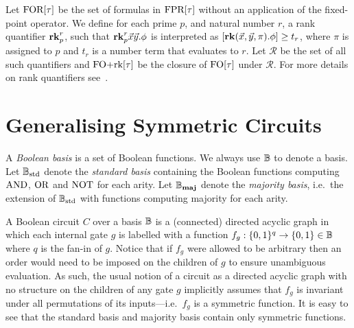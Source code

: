 \documentclass[a4paper,UKenglish]{lipics-v2018}
\begin{document}
Let $\text{\upshape FOR}[\tau]$ be the set of formulas in $\text{\upshape FPR}[\tau]$ without an application
of the fixed-point operator. We define for each prime $p$, and natural number
$r$, a rank quantifier $\text{\textbf{rk}}^r_p$, such that $\text{\textbf{rk}}^r_p\vec{x}\vec{y}. \phi$ is
interpreted as $[\text{\textbf{rk}} (\vec{x}, \vec{y}, \pi) . \phi] \geq t_r$, where $\pi$ is
assigned to $p$ and $t_r$ is a number term that evaluates to $r$. Let
$\mathcal{R}$ be the set of all such quantifiers and $\text{\upshape FO+rk}[\tau]$ be the
closure of $\text{\upshape FO}[\tau]$ under $\mathcal{R}$. For more details on rank quantifiers
see~\cite{Dawar09logicswith}.


\section{Generalising Symmetric Circuits}\label{sec:symm-circ}
A \emph{Boolean basis} is a set of Boolean functions. We always use $\mathbb{B}$ to
denote a basis. Let $\mathbb{B}_{\text{std}}$ denote the \emph{standard basis} containing the
Boolean functions computing $\text{\upshape AND}$, $\text{\upshape OR}$ and $\text{\upshape NOT}$ for each arity. Let $\mathbb{B}_{\text{\textbf{maj}}}$
denote the \emph{majority basis}, i.e.\ the extension of $\mathbb{B}_{\text{std}}$ with functions
computing majority for each arity.

A Boolean circuit $C$ over a basis $\mathbb{B}$ is a (connected) directed acyclic graph
in which each internal gate $g$ is labelled with a function $f_g : \{0,1\}^q \rightarrow
\{0,1\} \in \mathbb{B}$ where $q$ is the fan-in of $g$. Notice that if $f_g$ were
allowed to be arbitrary then an order would need to be imposed on the children
of $g$ to ensure unambiguous evaluation. As such, the usual notion of a circuit
as a directed acyclic graph with no structure on the children of any gate $g$
implicitly assumes that $f_g$ is invariant under all permutations of its
inputs---i.e.\ $f_g$ is a symmetric function. It is easy to see that the
standard basis and majority basis contain only symmetric functions.
\end{document}
